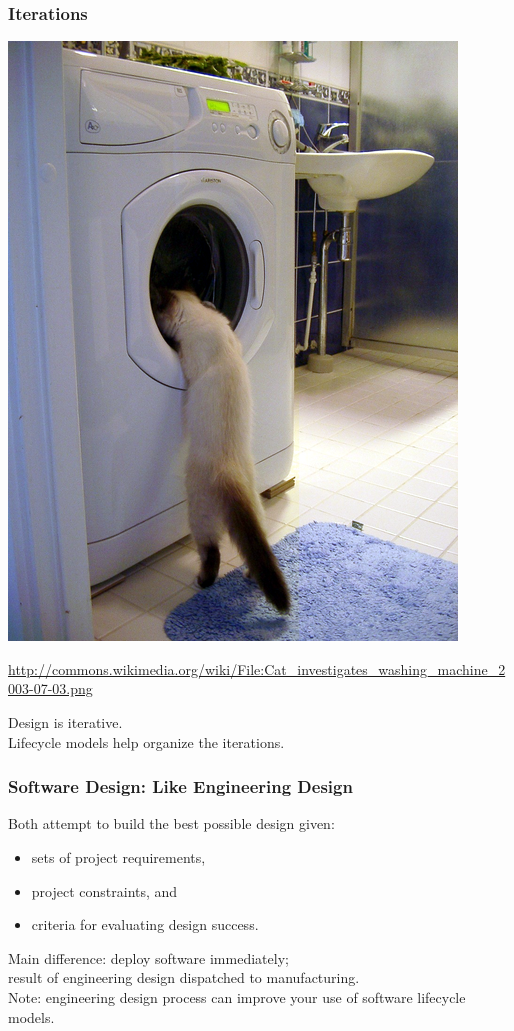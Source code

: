 \begin{frame}
\frametitle{Iterations}
\begin{center}
\includegraphics[width=.35\textwidth]{images/cat_iterations_small}
\end{center}
{\tiny \hfill \url{http://commons.wikimedia.org/wiki/File:Cat_investigates_washing_machine_2003-07-03.png}}

\begin{changemargin}{1cm}
Design is iterative.\\[1em]

Lifecycle models help organize the iterations.
\end{changemargin}
\end{frame}


\begin{frame}
\frametitle{Software Design: Like Engineering Design}

\begin{changemargin}{1.5cm}
Both attempt to build the best possible design given:\\

\begin{itemize}
\item sets of project requirements, 
\item project constraints, and 
\item criteria for evaluating design success.
\end{itemize}

Main difference: deploy software immediately; \\
result of engineering
design dispatched to manufacturing.\\[1em]

Note: engineering design process can improve your use of software
lifecycle models.
\end{changemargin}
\end{frame}

